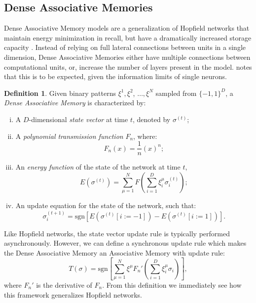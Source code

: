 \documentclass{article}
\theoremstyle{definition}
\newtheorem{definition}{Definition}[subsection]
\begin{document}
\subsection{Dense Associative Memories}\label{sec:dense-associative-memory}

Dense Associative Memory models are a generalization of Hopfield networks that
maintain energy minimization in recall, but have a dramatically
increased storage capacity \parencite{krotov_dense_2016,demircigil_model_2017}.
Instead of relying on full lateral connections between units in a
single dimension,
Dense Associative Memories either have multiple connections between
computational units, or, increase the number of layers present in the model.
\textcite{krotov_large_2021} notes that this is to be expected, given the
information limits of single neurons.

\begin{definition}
  Given binary patterns $\xi^1, \xi^2$, $\dots, \xi^N$ sampled from
  $\{-1, 1\}^D$,
  a \textit{Dense Associative Memory} is characterized by:
  \begin{enumerate}[(i)]
    \item A $D$-dimensional \textit{state vector} at time $t$, denoted by $\sigma^{(t)}$;
    \item A \textit{polynomial transmission function} $F_n$, where:
      \begin{equation}
        F_n (x) = \frac{1}{n} (x)^n;
      \end{equation}
    \item An \textit{energy function} of the state of the network at time $t$,
      \begin{equation}
        E(\sigma^{(t)}) = \sum^N_{\mu=1} F \left( \sum^D_{i=1}
        \xi^\mu_i \sigma^{(t)}_i \right);
      \end{equation}
    \item An update equation for the state of the network, such that:
      \begin{equation}
        \sigma^{(t+1)}_i = \text{sgn} \left[ E(\sigma^{(t)}[i := -1])
        - E(\sigma^{(t)}[i := 1]) \right].
      \end{equation}
  \end{enumerate}
\end{definition}

Like Hopfield networks, the state vector update rule is typically
performed asynchronously.
However, we can define a synchronous update rule which makes the
Dense Associative
Memory an Associative Memory with update rule:
\begin{equation}
  T(\sigma) = \text{sgn} \left[\sum^N_{\mu=1} \xi^\mu F_n' \left(
  \sum^D_{i=1} \xi^\mu_i \sigma_i \right)\right],
\end{equation}
where $F_n'$ is the derivative of $F_n$. From this definition we immediately
see how this framework generalizes Hopfield networks.
\end{document}
